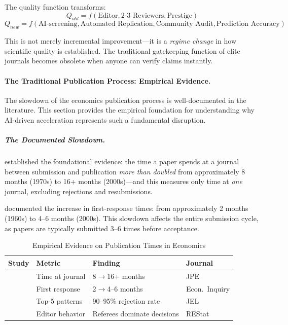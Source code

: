 The quality function transforms:
\begin{equation}
Q_{old} = f(\text{Editor}, \text{2-3 Reviewers}, \text{Prestige})
\end{equation}
\begin{equation}
Q_{new} = f(\text{AI-screening}, \text{Automated Replication}, \text{Community Audit}, \text{Prediction Accuracy})
\end{equation}

This is not merely incremental improvement---it is a \textit{regime change} in how
scientific quality is established. The traditional gatekeeping function of elite
journals becomes obsolete when anyone can verify claims instantly.

\paragraph{The Traditional Publication Process: Empirical Evidence.}

The slowdown of the economics publication process is well-documented in the literature.
This section provides the empirical foundation for understanding why AI-driven
acceleration represents such a fundamental disruption.

\subparagraph{The Documented Slowdown.}

\citet{ellison2002slowdown} established the foundational evidence: the time a paper
spends at a journal between submission and publication \textit{more than doubled}
from approximately 8 months (1970s) to 16+ months (2000s)---and this measures only
time at \textit{one} journal, excluding rejections and resubmissions.

\citet{azar2007slowdown} documented the increase in first-response times: from
approximately 2 months (1960s) to 4--6 months (2000s). This slowdown affects the
entire submission cycle, as papers are typically submitted 3--6 times before acceptance.

\begin{table}[htbp]
\centering
\caption{Empirical Evidence on Publication Times in Economics}
\label{tab:publication-times-evidence}
\renewcommand{\arraystretch}{1.3}
\small
\begin{tabular}{@{}llll@{}}
\toprule
\textbf{Study} & \textbf{Metric} & \textbf{Finding} & \textbf{Journal} \\
\midrule
\citet{ellison2002slowdown} & Time at journal & 8$\to$16+ months & JPE \\
\citet{azar2007slowdown} & First response & 2$\to$4--6 months & Econ.\ Inquiry \\
\citet{card2013ninefacts} & Top-5 patterns & 90--95\% rejection rate & JEL \\
\citet{card2020editors} & Editor behavior & Referees dominate decisions & REStat \\
\bottomrule
\end{tabular}
\end{table}

